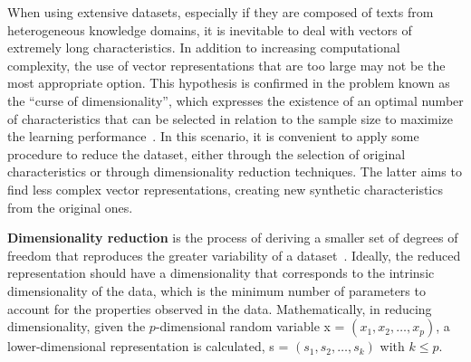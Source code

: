\documentclass{ieeeaccess}
\begin{document}
When using extensive datasets, especially if they are composed of texts from heterogeneous knowledge domains, it is inevitable to deal with vectors of extremely long characteristics. In addition to increasing computational complexity, the use of vector representations that are too large may not be the most appropriate option. This hypothesis is confirmed in the problem known as the ``curse of dimensionality'', which expresses the existence of an optimal number of characteristics that can be selected in relation to the sample size to maximize the learning performance~\cite{zhai2014emerging}. In this scenario, it is convenient to apply some procedure to reduce the dataset, either through the selection of original characteristics or through dimensionality reduction techniques. The latter aims to find less complex vector representations, creating new synthetic characteristics from the original ones.



\textbf{Dimensionality reduction} is the process of deriving a smaller set of degrees of freedom that reproduces the greater variability of a dataset~\cite{zhai2014emerging, AndreoniLopez2019}. Ideally, the reduced representation should have a dimensionality that corresponds to the intrinsic dimensionality of the data, which is the minimum number of parameters to account for the properties observed in the data. Mathematically, in reducing dimensionality, given the $ p $-dimensional random variable  x = $ (x_1, x_2, \ldots, x_p) $, a lower-dimensional representation is calculated, s = $ (s_1, s_2, \ldots, s_k) $ with $ k \leq p $.
\end{document}
